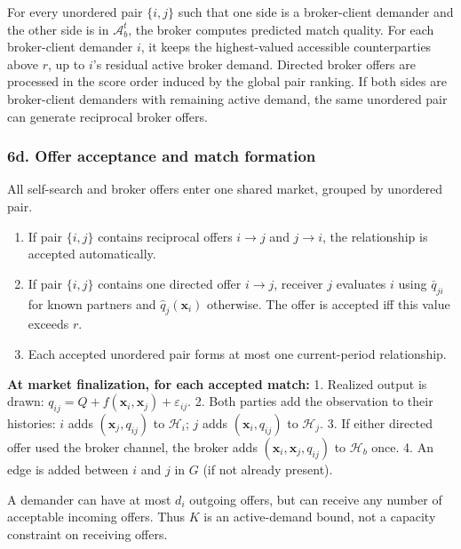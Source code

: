 \documentclass[11pt]{article}
\providecommand{\tightlist}{%
  \setlength{\itemsep}{0pt}\setlength{\parskip}{0pt}}
\begin{document}
For every unordered pair \(\{i,j\}\) such that one side is a broker-client demander and the other side is in \(\mathcal{A}_b^t\), the broker computes predicted match quality. For each broker-client demander \(i\), it keeps the highest-valued accessible counterparties above \(r\), up to \(i\)'s residual active broker demand. Directed broker offers are processed in the score order induced by the global pair ranking. If both sides are broker-client demanders with remaining active demand, the same unordered pair can generate reciprocal broker offers.

\subsubsection{6d. Offer acceptance and match formation}\label{d.-offer-acceptance-and-match-formation}

All self-search and broker offers enter one shared market, grouped by unordered pair.

\begin{enumerate}
\def\labelenumi{\arabic{enumi}.}
\tightlist
\item
  If pair \(\{i,j\}\) contains reciprocal offers \(i \to j\) and \(j \to i\), the relationship is accepted automatically.
\item
  If pair \(\{i,j\}\) contains one directed offer \(i \to j\), receiver \(j\) evaluates \(i\) using \(\bar{q}_{ji}\) for known partners and \(\hat{q}_j(\mathbf{x}_i)\) otherwise. The offer is accepted iff this value exceeds \(r\).
\item
  Each accepted unordered pair forms at most one current-period relationship.
\end{enumerate}

\textbf{At market finalization, for each accepted match:}
1. Realized output is drawn: \(q_{ij} = Q + f(\mathbf{x}_i, \mathbf{x}_j) + \varepsilon_{ij}\).
2. Both parties add the observation to their histories: \(i\) adds \((\mathbf{x}_j, q_{ij})\) to \(\mathcal{H}_{i}\); \(j\) adds \((\mathbf{x}_i, q_{ij})\) to \(\mathcal{H}_{j}\).
3. If either directed offer used the broker channel, the broker adds \((\mathbf{x}_i, \mathbf{x}_j, q_{ij})\) to \(\mathcal{H}_b\) once.
4. An edge is added between \(i\) and \(j\) in \(G\) (if not already present).

A demander can have at most \(d_i\) outgoing offers, but can receive any number of acceptable incoming offers. Thus \(K\) is an active-demand bound, not a capacity constraint on receiving offers.
\end{document}
